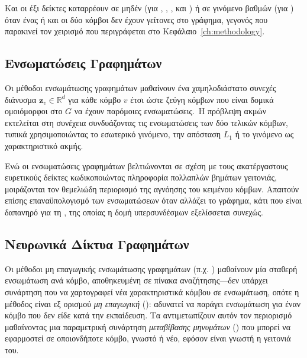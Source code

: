 Και οι έξι δείκτες καταρρέουν σε μηδέν (για , , ,  και ) ή σε γινόμενο
βαθμών (για ) όταν ένας ή και οι δύο κόμβοι δεν έχουν γείτονες στο γράφημα, γεγονός
που παρακινεί τον χειρισμό  που περιγράφεται στο
Κεφάλαιο~\ref{ch:methodology}.

\subsection{Ενσωματώσεις Γραφημάτων}
\label{subsec:graph-embeddings}

Οι μέθοδοι ενσωμάτωσης γραφημάτων μαθαίνουν ένα χαμηλοδιάστατο συνεχές διάνυσμα
$\mathbf{z}_v \in \mathbb{R}^d$ για κάθε κόμβο $v$ έτσι ώστε ζεύγη κόμβων που είναι
δομικά ομοιόμορφοι στο $G$ να έχουν παρόμοιες ενσωματώσεις.\ Η πρόβλεψη ακμών
εκτελείται στη συνέχεια συνδυάζοντας τις ενσωματώσεις των δύο τελικών κόμβων,
τυπικά χρησιμοποιώντας το εσωτερικό γινόμενο, την απόσταση $L_1$ ή το γινόμενο
 ως χαρακτηριστικό ακμής.


Ενώ οι ενσωματώσεις γραφημάτων βελτιώνονται σε σχέση με τους ακατέργαστους ευρετικούς δείκτες
κωδικοποιώντας πληροφορία πολλαπλών βημάτων γειτονιάς, μοιράζονται τον θεμελιώδη
περιορισμό της αγνόησης του κειμένου κόμβων.
Απαιτούν επίσης επαναϋπολογισμό των
ενσωματώσεων όταν αλλάζει το γράφημα, κάτι που είναι δαπανηρό για τη ,
της οποίας η δομή υπερσυνδέσμων εξελίσσεται συνεχώς.

\subsection{Νευρωνικά Δίκτυα Γραφημάτων}
\label{subsec:gnns}

Οι μέθοδοι μη επαγωγικής ενσωμάτωσης γραφημάτων (π.χ. ) μαθαίνουν μία σταθερή ενσωμάτωση ανά κόμβο,
αποθηκευμένη σε πίνακα αναζήτησης---δεν υπάρχει συνάρτηση που να χαρτογραφεί νέα
χαρακτηριστικά κόμβου σε ενσωμάτωση, οπότε η μέθοδος είναι εξ ορισμού \textit{μη
επαγωγική} (): αδυνατεί να παράγει ενσωμάτωση για έναν κόμβο που δεν
είδε κατά την εκπαίδευση.
Τα \textbf{} αντιμετωπίζουν
αυτόν τον περιορισμό μαθαίνοντας μια παραμετρική συνάρτηση \textit{μεταβίβασης
μηνυμάτων} () που μπορεί να εφαρμοστεί σε οποιονδήποτε κόμβο,
γνωστό ή νέο, εφόσον είναι γνωστή η γειτονιά του.


